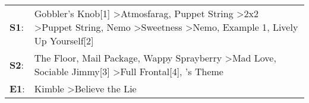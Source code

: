 \begin{supertabular}{p{0.03\textwidth}p{0.92\textwidth}}
 \textbf{S1}:  &  Gobbler's Knob[1]\textsuperscript{} \textgreater \enspace Atmosfarag\textsuperscript{}, \enspace Puppet String\textsuperscript{} \textgreater \enspace 2x2\textsuperscript{} \textgreater \enspace Puppet String\textsuperscript{}, \enspace Nemo\textsuperscript{} \textgreater \enspace Sweetness\textsuperscript{} \textgreater \enspace Nemo\textsuperscript{}, \enspace Example 1\textsuperscript{}, \enspace Lively Up Yourself[2]\textsuperscript{}  \enspace  \\
 \textbf{S2}:  &                                                                                                                                             The Floor\textsuperscript{}, \enspace Mail Package\textsuperscript{}, \enspace Wappy Sprayberry\textsuperscript{} \textgreater \enspace Mad Love\textsuperscript{}, \enspace Sociable Jimmy[3]\textsuperscript{} \textgreater \enspace Full Frontal[4]\textsuperscript{}, 's Theme\textsuperscript{}  \enspace  \\
 \textbf{E1}:  &                                                                                                                                                                                                                                                                                                                                                                            Kimble\textsuperscript{} \textgreater \enspace Believe the Lie\textsuperscript{}  \enspace  \\
\end{supertabular}
